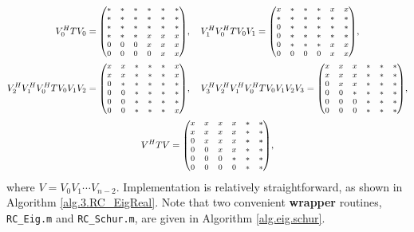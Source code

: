 \begin{gather*}
  V^H_0 T V_0 = {\footnotesize\begin{pmatrix} * & * & * & * & * & * \\ * & * & * & * & * & * \\ * & * & * & * & * & * \\ * & * & * & x & x & x \\ 0 & 0 & 0 & x & x & x \\ 0 & 0 & 0 & 0 & x & x \end{pmatrix}}, \quad 
  V^H_1 V^H_0 T V_0 V_1 = {\footnotesize\begin{pmatrix} x & * & * & * & x & x \\ * & * & * & * & * & * \\ 0 & * & * & * & * & * \\ 0 & * & * & * & * & * \\ 0 & * & * & * & x & x \\ 0 & 0 & 0 & 0 & x & x \end{pmatrix}}, \\
  V^H_2  V^H_1 V^H_0 T V_0  V_1 V_2 = {\footnotesize\begin{pmatrix} x & x & * & * & * & x \\ x & x & * & * & * & x \\ 0 & * & * & * & * & * \\ 0 & 0 & * & * & * & * \\ 0 & 0 & * & * & * & * \\ 0 & 0 & * & * & * & x \end{pmatrix}}, \quad
  V^H_3 V^H_2  V^H_1 V^H_0 T V_0 V_1 V_2 V_3 = {\footnotesize\begin{pmatrix} x & x & x & * & * & * \\ x & x & x & * & * & * \\ 0 & x & x & * & * & * \\ 0 & 0 & * & * & * & * \\ 0 & 0 & 0 & * & * & * \\ 0 & 0 & 0 & * & * & * \end{pmatrix}}, \\
  V^H T V = {\footnotesize\begin{pmatrix} x & x & x & x & * & * \\ x & x & x & x & * & * \\ 0 & x & x & x & * & * \\ 0 & 0 & x & x & * & * \\ 0 & 0 & 0 & * & * & * \\ 0 & 0 & 0 & 0 & * & * \end{pmatrix}},
\end{gather*}
where $V=V_0 V_1 \cdots V_{n-2}$.  Implementation is relatively straightforward, as shown in Algorithm \ref{alg.3.RC_EigReal}.  Note that two convenient {\bf wrapper} routines, {\tt RC_Eig.m} and {\tt RC_Schur.m},
are given in Algorithm \ref{alg.eig.schur}.

